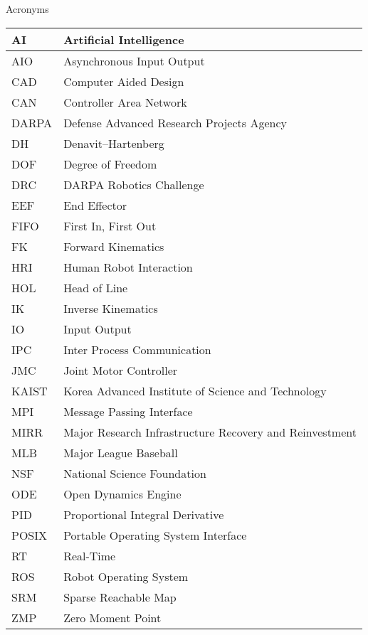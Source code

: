 \Large
\centering
Acronyms\\
\normalsize
\begin{tabular}{l | l}
\hline
AI & Artificial Intelligence\\
\hline
AIO & Asynchronous Input Output\\
\hline
CAD & Computer Aided Design\\
\hline
CAN & Controller Area Network \\
\hline
DARPA  &  Defense Advanced Research Projects Agency\\
\hline 
DH & Denavit–Hartenberg \\
\hline
DOF & Degree of Freedom \\
\hline
DRC  & DARPA Robotics Challenge \\
\hline
EEF  & End Effector\\
\hline
FIFO & First In, First Out\\
\hline
FK & Forward Kinematics\\
\hline
HRI & Human Robot Interaction\\
\hline
HOL & Head of Line\\
\hline
IK & Inverse Kinematics\\ 
\hline
IO & Input Output\\
\hline
IPC & Inter Process Communication \\
\hline
JMC & Joint Motor Controller\\
\hline
KAIST & Korea Advanced Institute of Science and Technology \\
\hline
MPI & Message Passing Interface\\
\hline
MIRR & Major Research Infrastructure Recovery and Reinvestment\\
\hline
MLB & Major League Baseball\\
\hline
NSF & National Science Foundation \\
\hline
ODE & Open Dynamics Engine\\
\hline
PID & Proportional Integral Derivative\\
\hline
POSIX & Portable Operating System Interface\\
\hline
RT & Real-Time\\
\hline
ROS & Robot Operating System\\
\hline
SRM & Sparse Reachable Map \\
\hline 
ZMP & Zero Moment Point\\
\hline
\end{tabular}
